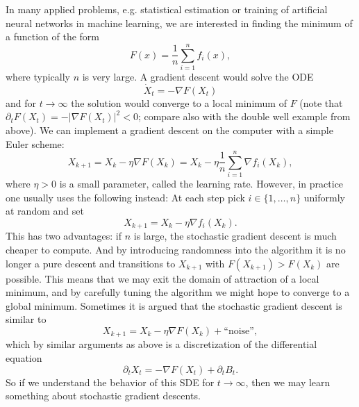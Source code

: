 \documentclass{article}
\newcommand{\tmtextit}[1]{\text{{\itshape{#1}}}}
\newcommand{\1}{\1}
\begin{document}
\begin{example*}
  In many applied problems, e.g. statistical estimation or training of
  artificial neural networks in machine learning, we are interested in finding
  the minimum of a function of the form
  \[ F (x) = \frac{1}{n} \sum_{i = 1}^n f_i (x), \]
  where typically $n$ is very large. A gradient descent would solve
  the ODE
  \[ \dot{X}_t = - \nabla F (X_t) \]
  and for $t \rightarrow \infty$ the solution would converge to a local
  minimum of $F$ (note that $\partial_t F (X_t) = - | \nabla F (X_t) |^2 < 0$;
  compare also with the double well example from above). We can implement a
  gradient descent on the computer with a simple Euler scheme:
  \[ X_{k + 1} = X_k - \eta \nabla F (X_k) = X_k - \eta \frac{1}{n} \sum_{i =
     1}^n \nabla f_i (X_k), \]
  where $\eta > 0$ is a small parameter, called the learning rate. However, in
  practice one usually uses the following \tmtextit{stochastic gradient
  descent} instead: At each step pick $i \in \{ 1, \ldots, n \}$ uniformly at
  random and set
  \[ X_{k + 1} = X_k - \eta \nabla f_i (X_k) . \]
  This has two advantages: if $n$ is large, the stochastic gradient descent is
  much cheaper to compute. And by introducing randomness into the algorithm it
  is no longer a pure descent and transitions to $X_{k + 1}$ with $F (X_{k +
  1}) > F (X_k)$ are possible. This means that we may exit the domain of
  attraction of a local minimum, and by carefully tuning the algorithm we
  might hope to converge to a global minimum. Sometimes it is argued that the
  stochastic gradient descent is similar to
  \[ X_{k + 1} = X_k - \eta \nabla F (X_k) + \text{``noise''}, \]
  which by similar arguments as above is a discretization of the differential
  equation
  \[ \partial_t X_t = - \nabla F (X_t) + \partial_t B_t . \]
  So if we understand the behavior of this SDE for $t \rightarrow \infty$,
  then we may learn something about stochastic gradient descents.
\end{example*}
\end{document}
